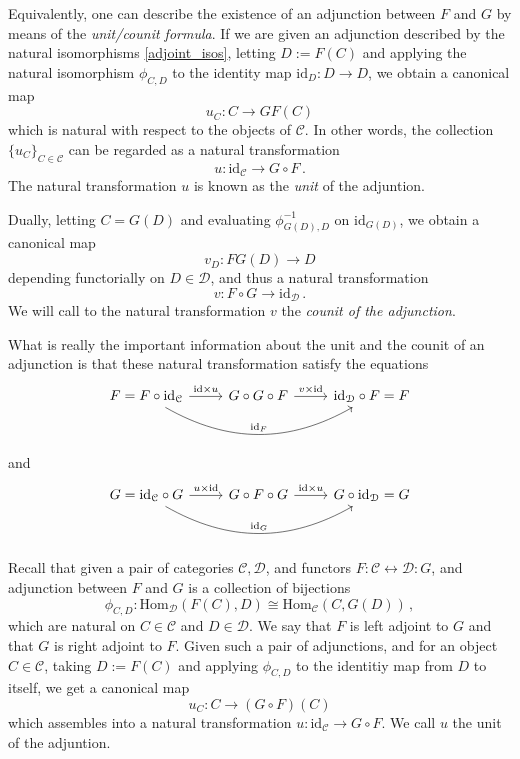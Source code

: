 \documentclass[a4paper,11pt]{article}
\newcommand{\Hom}{\mathrm{Hom}}
\newcommand{\ccal}{\mathcal{C}}
\newcommand{\dcal}{\mathcal{D}}
\newcommand{\ide}{\mathrm{id}}
\theoremstyle{plain}
\theoremstyle{definition}
\theoremstyle{remark}
\begin{document}
 
Equivalently, one can describe the existence of an adjunction between $F$ and $G$ by means of the \textit{unit/counit formula}. If we are given an adjunction described by the natural isomorphisms \eqref{adjoint_isos}, letting $D := F(C)$ and applying the natural isomorphism $\phi_{C,D}$ to the identity map $\ide_D \colon D \to D$, we obtain a canonical map 
$$u_C \colon C \to GF(C)$$
which is natural with respect to the objects of $\ccal$. In other words, the collection $\{u_C\}_{C \in \ccal}$ can be regarded as a natural transformation 
$$u \colon \ide_{\ccal} \to G \circ F \, .$$
The natural transformation $u$ is known as the \textit{unit} of the adjuntion.

Dually, letting $C = G(D)$ and evaluating $\phi_{G(D), D}^{-1}$ on $\ide_{G(D)}$, we obtain a canonical map 
$$v_D \colon FG(D) \to D$$
depending functorially on $D \in \dcal$, and thus a natural transformation 
$$v \colon F \circ G \to \ide_{\dcal} \, .$$
We will call to the natural transformation $v$ the \textit{counit of the adjunction}.


What is really the important information about the unit and the counit of an adjunction is that these natural transformation satisfy the equations
\begin{equation*}
\begin{tikzcd}
F = F \circ \ide_{\ccal} \arrow[rr, bend right, "\ide_F"] \arrow[r, "{\ide \times u}"] & G \circ G \circ F \arrow[r, "{v \times \ide}"] & \ide_{\dcal} \circ F = F
\end{tikzcd}
\end{equation*}
and 
\begin{equation*}
\begin{tikzcd}
G = \ide_{\ccal} \circ G \arrow[rr, bend right, "\ide_G"] \arrow[r, "{u \times \ide}"] & G \circ F \circ G \arrow[r, "{\ide \times u}"] & G \circ \ide_{\dcal} = G
\end{tikzcd}
\end{equation*}




Recall that given a pair of categories $\ccal, \dcal$, and functors $F \colon \ccal \longleftrightarrow \dcal \colon G$, and adjunction between $F$ and $G$ is a collection of bijections 
$$\phi_{C,D} \colon \Hom_{\dcal}(F(C), D) \cong \Hom_{\ccal}(C, G(D)) \, ,$$
which are natural on $C \in \ccal$ and $D \in \dcal$. We say that $F$ is left adjoint to $G$ and that $G$ is right adjoint to $F$. Given such a pair of adjunctions, and for an object $C \in \ccal$, taking $D := F(C)$ and applying $\phi_{C,D}$ to the identitiy map from $D$ to itself, we get a canonical map 
$$u_C \colon C \to (G \circ F)(C)$$
which assembles into a natural transformation $u \colon \ide_{\ccal} \to G \circ F$. We call $u$ the unit of the adjuntion. 
\end{document}
